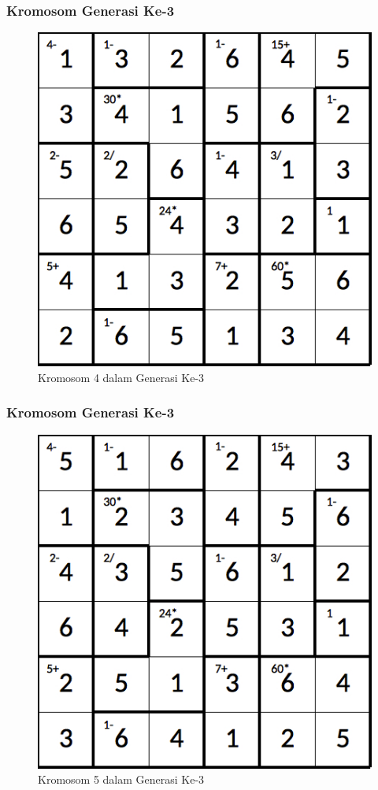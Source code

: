 \documentclass{beamer}
\begin{document}
\begin{frame}
\frametitle{Kromosom Generasi Ke-3}
\begin{figure}
\centering
\captionsetup{justification=centering}
\includegraphics[scale=0.333]{Gambar/hybridgenetic/Generation3Chromosome4}
\caption[Kromosom 4 dalam Generasi Ke-3]{Kromosom 4 dalam Generasi Ke-3}
\label{fig:analisisg3k4}
\end{figure}
\end{frame}

\note{

}

\begin{frame}
\frametitle{Kromosom Generasi Ke-3}
\begin{figure}
\centering
\captionsetup{justification=centering}
\includegraphics[scale=0.333]{Gambar/hybridgenetic/Generation3Chromosome5}
\caption[Kromosom 5 dalam Generasi Ke-3]{Kromosom 5 dalam Generasi Ke-3}
\label{fig:analisisg3k5}
\end{figure}
\end{frame}
\end{document}
